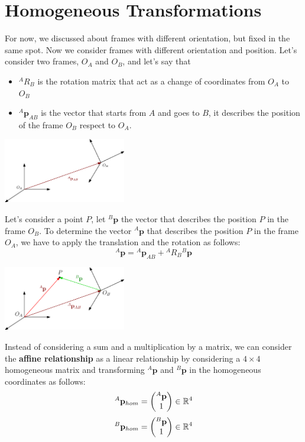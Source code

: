\documentclass[10pt, letterpaper]{report}
\begin{document}
\section{Homogeneous Transformations}
For now, we discussed about frames with different orientation, but fixed in the same spot. Now we consider frames with different orientation and position. Let's consider two frames, $O_A$ and $O_B$, and let's say that\begin{itemize}
    \item ${}^AR_B$ is the rotation matrix that act as a change of coordinates from $O_A$ to $O_B$ 
    \item ${}^A\mathbf p_{AB}$ is the vector that starts from $A$ and goes to $B$, it describes the position of the frame $O_B$ respect to $O_A$.
\end{itemize}
\begin{center}
    \includegraphics[width=0.4\textwidth ]{images/affine_rel1.eps}
\end{center}
Let's consider a point $P$, let ${}^B\mathbf p$ the vector that describes the position $P$ in the frame $O_B$. To determine the vector ${}^A\mathbf p$ that describes the position $P$ in the frame $O_A$, we have to apply the translation and the rotation as follows:\begin{equation}
    {}^A\mathbf p={}^A\mathbf p_{AB}+{}^AR_B{}^B\mathbf p
\end{equation}\begin{center}
    \includegraphics[width=0.4\textwidth ]{images/affine_rel2.eps}
\end{center}
Instead of considering a sum and a multiplication by a matrix, we can consider the \textbf{affine relationship} as a linear relationship by considering a $4\times 4$ homogeneous matrix and transforming $ {}^A\mathbf p$ and $ {}^B\mathbf p$ in the homogeneous coordinates as follows:\begin{equation}
    {}^A\mathbf p_{hom}=\begin{pmatrix}
        {}^A\mathbf p\\ 1 
    \end{pmatrix}\in{\mathbb R}^4
\end{equation}\begin{equation}
    {}^B\mathbf p_{hom}=\begin{pmatrix}
        {}^B\mathbf p\\ 1 
    \end{pmatrix}\in{\mathbb R}^4
\end{equation}
\end{document}
